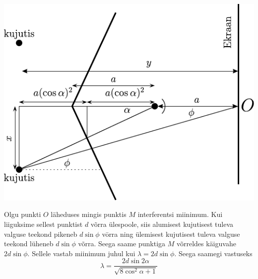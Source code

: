 \begin{center}
	\includegraphics[width=0.8\linewidth]{2004-v3g-09-lah.pdf}
\end{center}

Olgu punkti $O$ läheduses mingis punktis $M$ interferentsi miinimum. Kui liiguksime sellest punktist $d$ võrra ülespoole, siis alumisest kujutisest tuleva valguse teekond pikeneb $d \sin \phi$ vōrra ning ülemisest kujutisest tuleva valguse teekond lüheneb $d \sin \phi$ võrra. Seega saame punktiga $M$ võrreldes käiguvahe $2 d \sin \phi$. Sellele vastab miinimum juhul kui $\lambda=2 d \sin \phi$. Seega saamegi vastuseks
\[
\lambda=\frac{2 d \sin 2 \alpha}{\sqrt{8 \cos ^{2} \alpha+1}}
\]

\probend